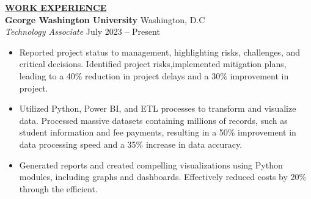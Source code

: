 \documentclass{article}
\begin{document}


% 
%
\noindent \textbf{\underline{WORK EXPERIENCE}} \\
\noindent \textbf{George Washington University} \hfill Washington, D.C \\
\textit{Technology Associate} \hfill July 2023 – Present
\begin{itemize}[noitemsep,nolistsep,leftmargin=*]
\item {Reported project status to management, highlighting risks, challenges, and critical decisions. Identified project risks,implemented mitigation plans, leading to a 40\% reduction in project delays and a 30\% improvement in project.}
\item {Utilized Python, Power BI, and ETL processes to transform and visualize data. Processed massive datasets containing millions of records, such as student information and fee payments, resulting in a 50\% improvement in data processing speed and a 35\% increase in data accuracy.}
\item {Generated reports and created compelling visualizations using Python modules, including graphs and dashboards. Effectively reduced costs by 20\% through the efficient.}
\vspace{1mm}
\end{itemize}
\end{document}
